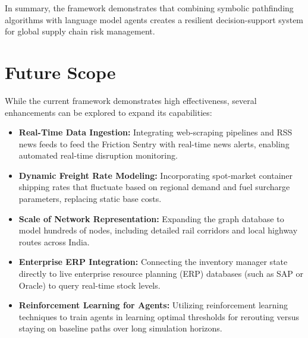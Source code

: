 In summary, the framework demonstrates that combining symbolic pathfinding algorithms with language model agents creates a resilient decision-support system for global supply chain risk management.

\section{Future Scope}
While the current framework demonstrates high effectiveness, several enhancements can be explored to expand its capabilities:
\begin{itemize}
    \item \textbf{Real-Time Data Ingestion:} Integrating web-scraping pipelines and RSS news feeds to feed the Friction Sentry with real-time news alerts, enabling automated real-time disruption monitoring.
    \item \textbf{Dynamic Freight Rate Modeling:} Incorporating spot-market container shipping rates that fluctuate based on regional demand and fuel surcharge parameters, replacing static base costs.
    \item \textbf{Scale of Network Representation:} Expanding the graph database to model hundreds of nodes, including detailed rail corridors and local highway routes across India.
    \item \textbf{Enterprise ERP Integration:} Connecting the inventory manager state directly to live enterprise resource planning (ERP) databases (such as SAP or Oracle) to query real-time stock levels.
    \item \textbf{Reinforcement Learning for Agents:} Utilizing reinforcement learning techniques to train agents in learning optimal thresholds for rerouting versus staying on baseline paths over long simulation horizons.
\end{itemize}

